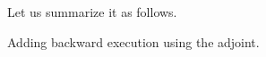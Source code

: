 \documentclass{llncs}
\begin{document}
\begin{center}
\end{center}

Let us summarize it as follows.

\begin{center}
\end{center}

Adding backward execution using the adjoint.

\begin{center}
\end{center}
\end{document}
